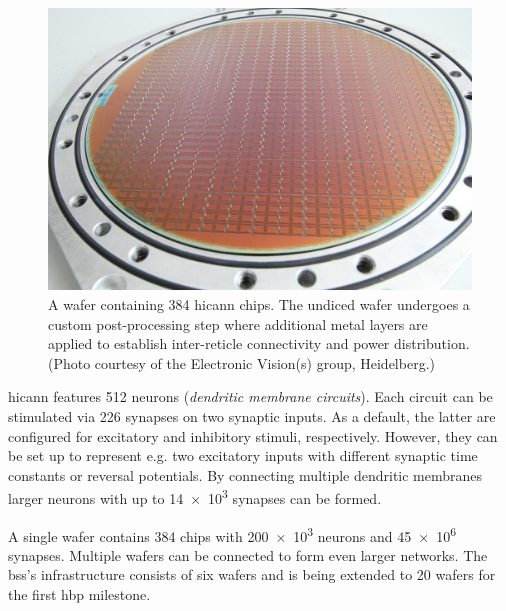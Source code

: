 \begin{figure}
	\begin{center}
		\includegraphics[width=\columnwidth]{assets/wafer.jpg}
	\end{center}
	\caption{A wafer containing 384 \gls{hicann} chips. The undiced wafer undergoes a custom post-processing step where additional metal layers are applied to establish inter-reticle connectivity and power distribution. (Photo courtesy of the Electronic Vision(s) group, Heidelberg.)}
	\label{fig:wafer}
\end{figure}

\gls{hicann} features 512 neurons (\emph{dendritic membrane circuits}). Each circuit can be stimulated via 226 synapses on two synaptic inputs. As a default, the latter are configured for excitatory and inhibitory stimuli, respectively. However, they can be set up to represent e.g. two excitatory inputs with different synaptic time constants or reversal potentials. By connecting multiple dendritic membranes larger neurons with up to \num{14e3} synapses can be formed.

A single wafer contains 384 chips with \num{200e3} neurons and \num{45e6} synapses. Multiple wafers can be connected to form even larger networks. The \gls{bss}'s infrastructure consists of six wafers and is being extended to 20 wafers for the first \gls{hbp} milestone.

%
%

